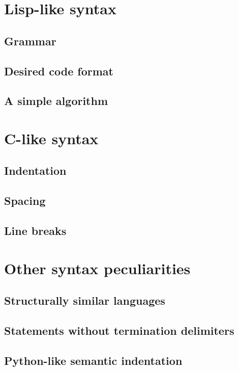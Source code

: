 

\chapter{Lisp-like syntax}
\section{Grammar}
\section{Desired code format}
\section{A simple algorithm}

\chapter{C-like syntax}
\section{Indentation}
\section{Spacing}
\section{Line breaks}

\chapter{Other syntax peculiarities}
\section{Structurally similar languages}
\section{Statements without termination delimiters}
\section{Python-like semantic indentation}
